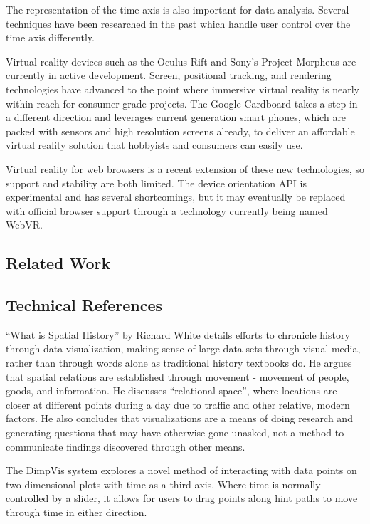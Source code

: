 \documentclass[conference]{acmsiggraph}
\begin{document}
The representation of the time axis is also important for data analysis.
Several techniques have been researched in the past which handle user control
over the time axis differently.

Virtual reality devices such as the Oculus Rift and Sony's Project Morpheus are
currently in active development. Screen, positional tracking, and rendering
technologies have advanced to the point where immersive virtual reality is
nearly within reach for consumer-grade projects. The Google Cardboard takes a
step in a different direction and leverages current generation smart phones,
which are packed with sensors and high resolution screens already, to deliver an
affordable virtual reality solution that hobbyists and consumers can easily use.

Virtual reality for web browsers is a recent extension of these new
technologies, so support and stability are both limited. The device orientation
API is experimental and has several shortcomings, but it may eventually be
replaced with official browser support through a technology currently being
named WebVR.


\subsection{Related Work}

\subsection{Technical References}

``What is Spatial History'' by Richard White \cite{White} details efforts to
chronicle history through data visualization, making sense of large data sets
through visual media, rather than through words alone as traditional history
textbooks do. He argues that spatial relations are established through movement
- movement of people, goods, and information. He discusses
``relational space'', where locations are closer at different points during a
day due to traffic and other relative, modern factors. He also concludes that
visualizations are a means of doing research and generating questions that may
have otherwise gone unasked, not a method to communicate findings discovered
through other means.

The DimpVis system \cite{10.1109/TVCG.2014.2346250} explores a novel method of
interacting with data points on two-dimensional plots with time as a third
axis. Where time is normally controlled by a slider, it allows for users to
drag points along hint paths to move through time in either direction.
\end{document}
